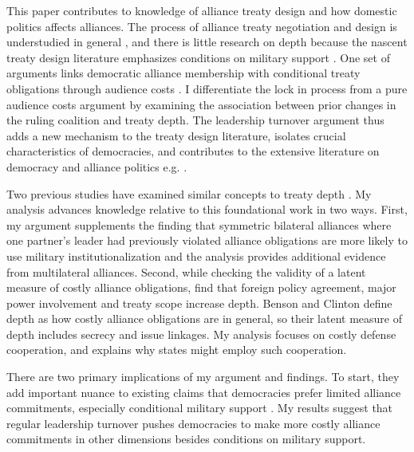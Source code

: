 \documentclass[12pt]{article}
\begin{document}
This paper contributes to knowledge of alliance treaty design and how domestic politics affects alliances.
The process of alliance treaty negotiation and design is understudied in general \citep{Poast2019a}, and there is little research on depth because the nascent treaty design literature emphasizes conditions on military support \citep{Kim2011, Benson2012, Mattes2012, Chibaetal2015, FjelstulReiter2019}.
One set of arguments links democratic alliance membership with conditional treaty obligations through audience costs \citep{Mattes2012, Chibaetal2015, FjelstulReiter2019}. 
I differentiate the lock in process from a pure audience costs argument by examining the association between prior changes in the ruling coalition and treaty depth. 
The leadership turnover argument thus adds a new mechanism to the treaty design literature, isolates crucial characteristics of democracies, and contributes to the extensive literature on democracy and alliance politics e.g. \citep{LaiReiter2000, Mattes2012a, McManusYarhi-Milo2017}. 


Two previous studies have examined similar concepts to treaty depth \citep{Mattes2012, BensonClinton2016}. 
My analysis advances knowledge relative to this foundational work in two ways.  
First, my argument supplements the finding that symmetric bilateral alliances where one partner's leader had previously violated alliance obligations are more likely to use military institutionalization \citep{Mattes2012} and the analysis provides additional evidence from multilateral alliances.  
Second, while checking the validity of a latent measure of costly alliance obligations, \citet{BensonClinton2016} find that foreign policy agreement, major power involvement and treaty scope increase depth. 
Benson and Clinton define depth as how costly alliance obligations are in general, so their latent measure of depth includes secrecy and issue linkages.
My analysis focuses on costly defense cooperation, and explains why states might employ such cooperation. 


There are two primary implications of my argument and findings. 
To start, they add important nuance to existing claims that democracies prefer limited alliance commitments, especially conditional military support \citep{Mattes2012, Chibaetal2015, FjelstulReiter2019}.
My results suggest that regular leadership turnover pushes democracies to make more costly alliance commitments in other dimensions besides conditions on military support. 
\end{document}
